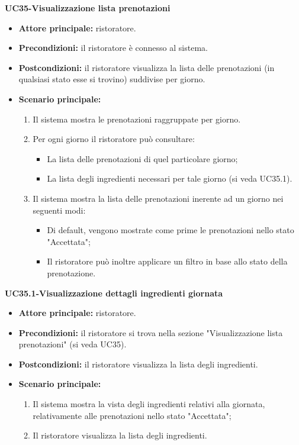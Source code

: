\textbf{UC35-Visualizzazione lista prenotazioni}
\begin{itemize}
\item \textbf{Attore principale:} ristoratore.
\item \textbf{Precondizioni:} il ristoratore è connesso al sistema.
\item \textbf{Postcondizioni:} il ristoratore visualizza la lista delle prenotazioni (in qualsiasi stato esse si trovino) suddivise per giorno.
\item \textbf{Scenario principale:}
\begin{enumerate}
    \item Il sistema mostra le prenotazioni raggruppate per giorno.
    \item Per ogni giorno il ristoratore può consultare:
    \begin{itemize}
        \item La lista delle prenotazioni di quel particolare giorno;
        \item La lista degli ingredienti necessari per tale giorno (si veda UC35.1).
    \end{itemize}
    \item Il sistema mostra la lista delle prenotazioni inerente ad un giorno nei seguenti modi:
    \begin{itemize}
        \item Di default, vengono mostrate come prime le prenotazioni nello stato "Accettata";
        \item Il ristoratore può inoltre applicare un filtro in base allo stato della prenotazione.
    \end{itemize}
\end{enumerate}
\end{itemize}

\textbf{UC35.1-Visualizzazione dettagli ingredienti giornata}
\begin{itemize}
\item \textbf{Attore principale:} ristoratore.
\item \textbf{Precondizioni:} il ristoratore si trova nella sezione "Visualizzazione lista prenotazioni" (si veda UC35).
\item \textbf{Postcondizioni:} il ristoratore visualizza la lista degli ingredienti.
\item \textbf{Scenario principale:}
\begin{enumerate}
    \item Il sistema mostra la vista degli ingredienti relativi alla giornata, relativamente alle prenotazioni nello stato "Accettata";
    \item Il ristoratore visualizza la lista degli ingredienti.
\end{enumerate}
\end{itemize}

